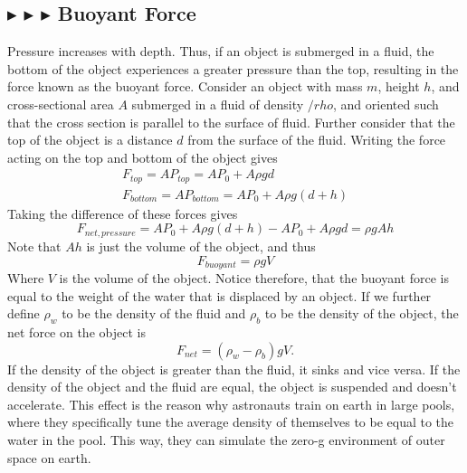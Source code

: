 \subsection{\color{OrangeRed} $\blacktriangleright$ \color{Goldenrod} $\blacktriangleright$ \color{Orchid} $\blacktriangleright$ \color{black} Buoyant Force}
Pressure increases with depth. Thus, if an object is submerged in a fluid, the bottom of the object experiences a greater pressure than the top, resulting in the force known as the buoyant force. Consider an object with mass $m$, height $h$, and cross-sectional area $A$ submerged in a fluid of density $/rho$, and oriented such that the cross section is parallel to the surface of fluid. Further consider that the top of the object is a distance $d$ from the surface of the fluid. Writing the force acting on the top and bottom of the object gives
\begin{align*}
    F_{top} = AP_{top} = AP_0 + A\rho gd \\
    F_{bottom} = AP_{bottom} = AP_0 + A\rho g(d+h)
\end{align*}
\noindent Taking the difference of these forces gives
\begin{equation*}
    F_{net,pressure} = AP_0 + A\rho g(d+h) - AP_0 + A\rho gd = \rho gAh
\end{equation*}
\noindent Note that $Ah$ is just the volume of the object, and thus
\begin{equation}
    \boxed{F_{buoyant} = \rho g V}
\end{equation}
\noindent Where $V$ is the volume of the object. Notice therefore, that the buoyant force is equal to the weight of the water that is displaced by an object. If we further define $\rho_w$ to be the density of the fluid and $\rho_b$ to be the density of the object, the net force on the object is
\begin{equation*}
    F_{net} = (\rho_w-\rho_b)gV.
\end{equation*}
\noindent If the density of the object is greater than the fluid, it sinks and vice versa. If the density of the object and the fluid are equal, the object is suspended and doesn't accelerate. This effect is the reason why astronauts train on earth in large pools, where they specifically tune the average density of themselves to be equal to the water in the pool. This way, they can simulate the zero-g environment of outer space on earth. 

